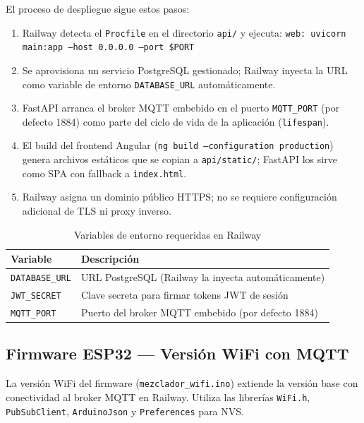 \documentclass[conference]{IEEEtran}
\begin{document}
El proceso de despliegue sigue estos pasos:
\begin{enumerate}
    \item Railway detecta el \texttt{Procfile} en el directorio \texttt{api/} y ejecuta:
          \texttt{web: uvicorn main:app --host 0.0.0.0 --port \$PORT}
    \item Se aprovisiona un servicio PostgreSQL gestionado; Railway inyecta la URL como variable de entorno \texttt{DATABASE\_URL} autom\'aticamente.
    \item FastAPI arranca el broker MQTT embebido en el puerto \texttt{MQTT\_PORT} (por defecto 1884) como parte del ciclo de vida de la aplicaci\'on (\texttt{lifespan}).
    \item El build del frontend Angular (\texttt{ng build --configuration production}) genera archivos est\'aticos que se copian a \texttt{api/static/}; FastAPI los sirve como SPA con fallback a \texttt{index.html}.
    \item Railway asigna un dominio p\'ublico HTTPS; no se requiere configuraci\'on adicional de TLS ni proxy inverso.
\end{enumerate}

\begin{table}[H]
\centering
\caption{Variables de entorno requeridas en Railway}
\renewcommand{\arraystretch}{1.3}
\begin{tabular}{|l|p{5cm}|}
\hline
\textbf{Variable} & \textbf{Descripci\'on} \\
\hline
\texttt{DATABASE\_URL} & URL PostgreSQL (Railway la inyecta autom\'aticamente) \\
\hline
\texttt{JWT\_SECRET}   & Clave secreta para firmar tokens JWT de sesi\'on \\
\hline
\texttt{MQTT\_PORT}    & Puerto del broker MQTT embebido (por defecto 1884) \\
\hline
\end{tabular}
\end{table}

\subsection{Firmware ESP32 --- Versi\'on WiFi con MQTT}

La versi\'on WiFi del firmware (\texttt{mezclador\_wifi.ino}) extiende la versi\'on base con conectividad al broker MQTT en Railway. Utiliza las librer\'ias \texttt{WiFi.h}, \texttt{PubSubClient}, \texttt{ArduinoJson} y \texttt{Preferences} para NVS.
\end{document}
